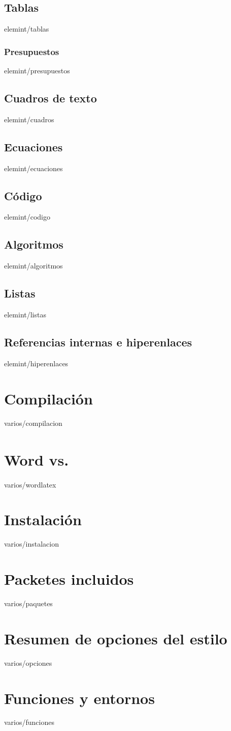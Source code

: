 \documentclass[epsbased,copyright,final,printable,covers,extendedindex,firstnumbered,tfg,gnuplot]{tfgtfmthesisuam}
\begin{document}
  \section{Tablas\label{SEC:TABLAS}}{elemint/tablas}
    \subsection{Presupuestos\label{SS:PRESUPUESTOS}}{elemint/presupuestos}
  \section{Cuadros de texto\label{SEC:CUADROS}}{elemint/cuadros}
  \section{Ecuaciones\label{SEC:ECUACIONES}}{elemint/ecuaciones}
  \section{Código\label{SEC:CODIGO}}{elemint/codigo}
  \section{Algoritmos\label{SEC:ALGORITMOS}}{elemint/algoritmos}
  \section{Listas\label{SEC:LISTAS}}{elemint/listas}
  \section{Referencias internas e hiperenlaces\label{SEC:HIPERENLACES}}{elemint/hiperenlaces}
\chapter{Compilación\label{CAP:COMPILACION}}{varios/compilacion}

\appendix

\chapter{Word\texorpdfstring{\textsuperscript{\textregistered}}{®} vs. \LaTeXe\label{CAP:WORDLATEX}}{varios/wordlatex}
\chapter{Instalación\label{CAP:INSTALACION}}{varios/instalacion}
\chapter{Packetes incluidos\label{CAP:PAQUETES}}{varios/paquetes}
\chapter{Resumen de opciones del estilo\label{CAP:OPCIONES}}{varios/opciones}
\chapter{Funciones y entornos\label{CAP:FUNCENT}}{varios/funciones}
\end{document}
